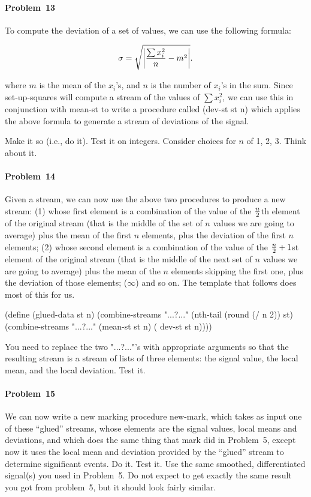 {\samepage
\paragraph{Problem~13}  To compute the deviation of a set of values, we can
use the following formula:

\nopagebreak[4]
\[\sigma = \sqrt{\left|{{\sum x_i^2} \over n} - m^2\right|}.\]

\nopagebreak[4]
where $m$ is the mean of the $x_i$'s, and $n$ is the number of $x_i$'s
in the sum.  Since {\cf set-up-squares} will
compute a stream of the values of ${\sum x_i^2}$, we can use this in
conjunction with {\cf mean-st} to write a procedure called {\cf (dev-st
st n)} which applies the above formula to generate a stream of
deviations of the signal.

\nopagebreak[4]
Make it so (i.e., do it). Test it on {\cf integers}. Consider choices for $n$
of 1, 2, 3. Think about it.}


\paragraph{Problem~14}  Given a stream, we can now use the above two
procedures to produce a new stream: (1) whose first element is a combination
of the value of the ${n \over 2}$th element of the original stream (that
is the middle of the set of $n$ values we are going to average) plus the
mean of the first $n$ elements, plus the deviation of the first $n$
elements; (2) whose second element is a combination of 
the value of the ${n \over 2} + 1$st element of the original stream (that
is the middle of the next set of $n$ values we are going to average) plus the
mean of the $n$ elements skipping the first one, plus the deviation of
those elements; ($\infty$) and so on. The template that follows does most of this for
us.

\beginlisp
(define (glued-data st n)
  (combine-streams "...?..."
                   (nth-tail (round (/ n 2)) st)
                   (combine-streams "...?..."
                                    (mean-st st n)
                                    ( dev-st st n))))
\endlisp

You need to replace the two {\cf "...?..."}'s with appropriate arguments so
that the resulting stream is a stream of lists of three elements: the
signal value, the local mean, and the local deviation. Test it.


\paragraph{Problem~15}  We can now write a new marking procedure {\cf new-mark},
which
takes as input one of these ``glued'' streams, whose elements are the
signal values, local means and deviations, and which does the same
thing that {\cf mark} did in Problem~5, except now it uses the local
mean and deviation provided by the ``glued'' stream to determine
significant events.  Do it. Test it. Use the same smoothed, differentiated
signal(s) you used in Problem~5. Do not expect to get exactly the same result
you got from problem~5, but it should look fairly similar.


